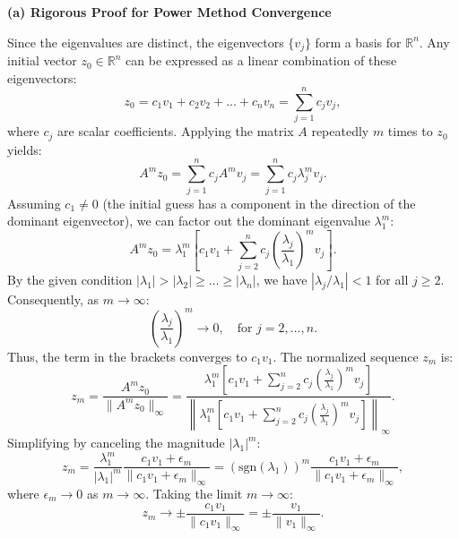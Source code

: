 \begin{solution}
\textbf{(a) Rigorous Proof for Power Method Convergence}

Since the eigenvalues are distinct, the eigenvectors $\{v_j\}$ form a basis for $\mathbb{R}^n$. Any initial vector $z_0 \in \mathbb{R}^n$ can be expressed as a linear combination of these eigenvectors:
\begin{equation}
    z_0 = c_1 v_1 + c_2 v_2 + \dots + c_n v_n = \sum_{j=1}^n c_j v_j, \label{eq:z0_expansion}
\end{equation}
where $c_j$ are scalar coefficients. Applying the matrix $A$ repeatedly $m$ times to $z_0$ yields:
\begin{equation}
    A^m z_0 = \sum_{j=1}^n c_j A^m v_j = \sum_{j=1}^n c_j \lambda_j^m v_j. \label{eq:Am_z0}
\end{equation}
Assuming $c_1 \neq 0$ (the initial guess has a component in the direction of the dominant eigenvector), we can factor out the dominant eigenvalue $\lambda_1^m$:
\begin{equation}
    A^m z_0 = \lambda_1^m \left[ c_1 v_1 + \sum_{j=2}^n c_j \left( \frac{\lambda_j}{\lambda_1} \right)^m v_j \right]. \label{eq:Am_z0_factored}
\end{equation}
By the given condition $|\lambda_1| > |\lambda_2| \geq \dots \geq |\lambda_n|$, we have $|\lambda_j / \lambda_1| < 1$ for all $j \geq 2$. Consequently, as $m \to \infty$:
\[ \left( \frac{\lambda_j}{\lambda_1} \right)^m \to 0, \quad \text{for } j = 2, \dots, n. \]
Thus, the term in the brackets converges to $c_1 v_1$. The normalized sequence $z_m$ is:
\[ z_m = \frac{A^m z_0}{\|A^m z_0\|_\infty} = \frac{\lambda_1^m \left[ c_1 v_1 + \sum_{j=2}^n c_j \left( \frac{\lambda_j}{\lambda_1} \right)^m v_j \right]}{\left\| \lambda_1^m \left[ c_1 v_1 + \sum_{j=2}^n c_j \left( \frac{\lambda_j}{\lambda_1} \right)^m v_j \right] \right\|_\infty}. \]
Simplifying by canceling the magnitude $|\lambda_1|^m$:
\[ z_m = \frac{\lambda_1^m}{|\lambda_1|^m} \frac{c_1 v_1 + \epsilon_m}{\|c_1 v_1 + \epsilon_m\|_\infty} = (\text{sgn}(\lambda_1))^m \frac{c_1 v_1 + \epsilon_m}{\|c_1 v_1 + \epsilon_m\|_\infty}, \]
where $\epsilon_m \to 0$ as $m \to \infty$. Taking the limit $m \to \infty$:
\[ z_m \to \pm \frac{c_1 v_1}{\|c_1 v_1\|_\infty} = \pm \frac{v_1}{\|v_1\|_\infty}. \]

\end{solution}
